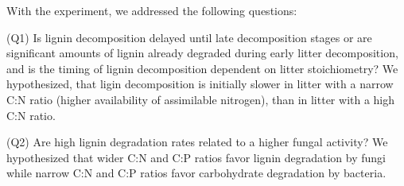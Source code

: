 With the experiment, we addressed the following questions:

(Q1) Is lignin decomposition delayed until late decomposition stages or are significant amounts of lignin already degraded during early litter decomposition, and is the timing of lignin decomposition dependent on litter stoichiometry? We hypothesized, that ligin decomposition is initially slower in litter with a narrow C:N ratio (higher availability of assimilable nitrogen), than in litter with a high C:N ratio.

(Q2) Are high lignin degradation rates related to a higher fungal activity? We hypothesized that wider C:N and C:P ratios favor lignin degradation by fungi while narrow C:N and C:P ratios favor carbohydrate degradation by bacteria. 